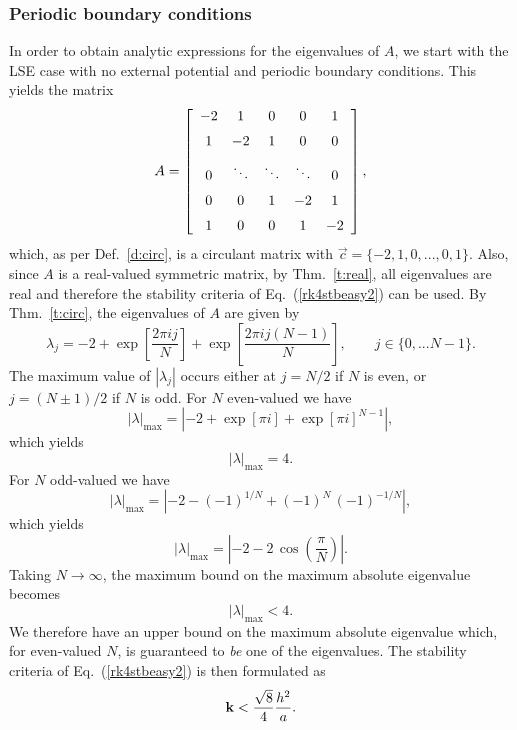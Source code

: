 \documentclass{article}
\begin{document}
\subsubsection{Periodic boundary conditions}
\label{s:percd}
In order to obtain analytic expressions for the eigenvalues of $A$, we start with the LSE case with no external potential and periodic boundary conditions.  This yields the matrix
\[
A = \left[\begin {array}{cccccc} -2& 1& 0& 0& 1\\\noalign{\medskip}
                                  1&-2& 1& 0& 0\\\noalign{\medskip}
                                  0& \ddots&\ddots & \ddots & 0\\\noalign{\medskip}
                                  0& 0& 1 &-2& 1\\\noalign{\medskip}
                                  1& 0& 0& 1&-2\end {array} \right],
\]
which, as per Def.~\ref{d:circ}, is a circulant matrix with $\vec c = \{-2,1,0,...,0,1\}$.  Also, since $A$ is a real-valued symmetric matrix, by Thm.~\ref{t:real}, all eigenvalues are real and therefore the stability criteria of Eq.~(\ref{rk4stbeasy2}) can be used.  By Thm.~\ref{t:circ}, the eigenvalues of $A$ are given by
\[
\lambda_j = -2 + \exp\left[\frac{2\pi i j }{N}\right] +  \exp\left[\frac{2\pi i j (N-1)}{N}\right], \qquad j\in\{0,...N-1\}.
\]
The maximum value of $|\lambda_j|$ occurs either at $j=N/2$ if $N$ is even, or $j=(N\pm 1)/2$ if $N$ is odd. For $N$ even-valued we have
\[
|\lambda|_{\max} = \left|-2 + \exp\left[\pi i\right] + \exp\left[\pi i\right]^{N-1}\right|,
\]
which yields
\[
|\lambda|_{\max} = 4.
\]
For $N$ odd-valued we have
\[
|\lambda|_{\max} = \left|-2 - (-1)^{1/N} + (-1)^N\,(-1)^{-1/N}\right|,
\]
which yields
\[
|\lambda|_{\max} = \left|-2 - 2\,\cos\left(\frac{\pi}{N}\right)\right|.
\]
Taking $N\rightarrow \infty$, the maximum bound on the maximum absolute eigenvalue becomes
\[
|\lambda|_{\max} < 4.
\]
We therefore have an upper bound on the maximum absolute eigenvalue which, for even-valued $N$, is guaranteed to \emph{be} one of the eigenvalues.  The stability criteria of Eq.~(\ref{rk4stbeasy2}) is then formulated as
\begin{equation}
\label{1dcircbound}
{\bf k} < \frac{\sqrt{8}}{4}\frac{h^2}{a}.
\end{equation}
\end{document}
